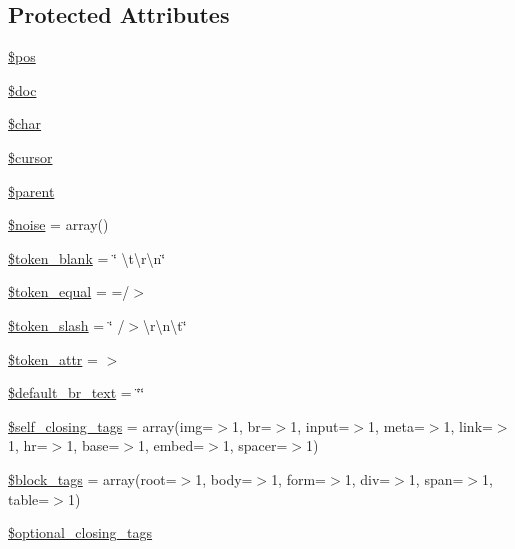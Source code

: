 \subsection*{Protected Attributes}
\begin{DoxyCompactItemize}
\item 
\hyperlink{classsimple__html__dom_a5de51f0c80b3bb3b39a57b23f6b9ea9f}{\$pos}
\item 
\hyperlink{classsimple__html__dom_afc5e9ce512cd97cf2e0e25bb20dcd39b}{\$doc}
\item 
\hyperlink{classsimple__html__dom_a128242871482e787498df34c33223f14}{\$char}
\item 
\hyperlink{classsimple__html__dom_a256b6d58b346bcd39d5bf5d49de70df2}{\$cursor}
\item 
\hyperlink{classsimple__html__dom_a4e2313a4b35b72a06ac45fd38960f677}{\$parent}
\item 
\hyperlink{classsimple__html__dom_a2774f17621ab4d3b64411f86c88df407}{\$noise} = array()
\item 
\hyperlink{classsimple__html__dom_ab7f68c12b4913a3685778154760151cd}{\$token\+\_\+blank} = \char`\"{} \textbackslash{}t\textbackslash{}r\textbackslash{}n\char`\"{}
\item 
\hyperlink{classsimple__html__dom_a554179de2a5fb6395ce5ec3ff38f3169}{\$token\+\_\+equal} = \textquotesingle{} =/$>$\textquotesingle{}
\item 
\hyperlink{classsimple__html__dom_a6e9298d28dc391aa70939916476fd4d1}{\$token\+\_\+slash} = \char`\"{} /$>$\textbackslash{}r\textbackslash{}n\textbackslash{}t\char`\"{}
\item 
\hyperlink{classsimple__html__dom_a0fb7a78d4e17bb7d156df4f5b79c4d30}{\$token\+\_\+attr} = \textquotesingle{} $>$\textquotesingle{}
\item 
\hyperlink{classsimple__html__dom_abd3661f931d84bc5e904cfd8e8e00833}{\$default\+\_\+br\+\_\+text} = \char`\"{}\char`\"{}
\item 
\hyperlink{classsimple__html__dom_af36f0e679f54f7ee558dd5b96d4b8727}{\$self\+\_\+closing\+\_\+tags} = array(\textquotesingle{}img\textquotesingle{}=$>$1, \textquotesingle{}br\textquotesingle{}=$>$1, \textquotesingle{}input\textquotesingle{}=$>$1, \textquotesingle{}meta\textquotesingle{}=$>$1, \textquotesingle{}link\textquotesingle{}=$>$1, \textquotesingle{}hr\textquotesingle{}=$>$1, \textquotesingle{}base\textquotesingle{}=$>$1, \textquotesingle{}embed\textquotesingle{}=$>$1, \textquotesingle{}spacer\textquotesingle{}=$>$1)
\item 
\hyperlink{classsimple__html__dom_ac513b8dc3142f886d0609b7893fe6026}{\$block\+\_\+tags} = array(\textquotesingle{}root\textquotesingle{}=$>$1, \textquotesingle{}body\textquotesingle{}=$>$1, \textquotesingle{}form\textquotesingle{}=$>$1, \textquotesingle{}div\textquotesingle{}=$>$1, \textquotesingle{}span\textquotesingle{}=$>$1, \textquotesingle{}table\textquotesingle{}=$>$1)
\item 
\hyperlink{classsimple__html__dom_a0aa8137deceff2940ae24f30bdb37379}{\$optional\+\_\+closing\+\_\+tags}
\end{DoxyCompactItemize}



